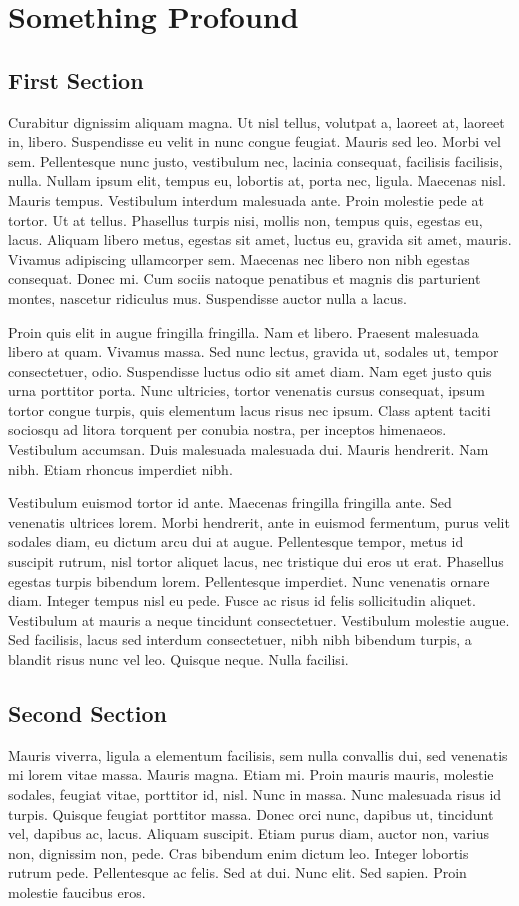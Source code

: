 \chapter{Something Profound}
\section{First Section}
Curabitur dignissim aliquam magna. Ut nisl tellus, volutpat a, laoreet at, laoreet in, libero. Suspendisse eu velit in nunc congue feugiat. Mauris sed leo. Morbi vel sem. Pellentesque nunc justo, vestibulum nec, lacinia consequat, facilisis facilisis, nulla. Nullam ipsum elit, tempus eu, lobortis at, porta nec, ligula. Maecenas nisl. Mauris tempus. Vestibulum interdum malesuada ante. Proin molestie pede at tortor. Ut at tellus. Phasellus turpis nisi, mollis non, tempus quis, egestas eu, lacus. Aliquam libero metus, egestas sit amet, luctus eu, gravida sit amet, mauris. Vivamus adipiscing ullamcorper sem. Maecenas nec libero non nibh egestas consequat. Donec mi. Cum sociis natoque penatibus et magnis dis parturient montes, nascetur ridiculus mus. Suspendisse auctor nulla a lacus.

Proin quis elit in augue fringilla fringilla. Nam et libero. Praesent malesuada libero at quam. Vivamus massa. Sed nunc lectus, gravida ut, sodales ut, tempor consectetuer, odio. Suspendisse luctus odio sit amet diam. Nam eget justo quis urna porttitor porta. Nunc ultricies, tortor venenatis cursus consequat, ipsum tortor congue turpis, quis elementum lacus risus nec ipsum. Class aptent taciti sociosqu ad litora torquent per conubia nostra, per inceptos himenaeos. Vestibulum accumsan. Duis malesuada malesuada dui. Mauris hendrerit. Nam nibh. Etiam rhoncus imperdiet nibh.

Vestibulum euismod tortor id ante. Maecenas fringilla fringilla ante. Sed venenatis ultrices lorem. Morbi hendrerit, ante in euismod fermentum, purus velit sodales diam, eu dictum arcu dui at augue. Pellentesque tempor, metus id suscipit rutrum, nisl tortor aliquet lacus, nec tristique dui eros ut erat. Phasellus egestas turpis bibendum lorem. Pellentesque imperdiet. Nunc venenatis ornare diam. Integer tempus nisl eu pede. Fusce ac risus id felis sollicitudin aliquet. Vestibulum at mauris a neque tincidunt consectetuer. Vestibulum molestie augue. Sed facilisis, lacus sed interdum consectetuer, nibh nibh bibendum turpis, a blandit risus nunc vel leo. Quisque neque. Nulla facilisi.

\section{Second Section}
Mauris viverra, ligula a elementum facilisis, sem nulla convallis dui, sed venenatis mi lorem vitae massa. Mauris magna. Etiam mi. Proin mauris mauris, molestie sodales, feugiat vitae, porttitor id, nisl. Nunc in massa. Nunc malesuada risus id turpis. Quisque feugiat porttitor massa. Donec orci nunc, dapibus ut, tincidunt vel, dapibus ac, lacus. Aliquam suscipit. Etiam purus diam, auctor non, varius non, dignissim non, pede. Cras bibendum enim dictum leo. Integer lobortis rutrum pede. Pellentesque ac felis. Sed at dui. Nunc elit. Sed sapien. Proin molestie faucibus eros.

